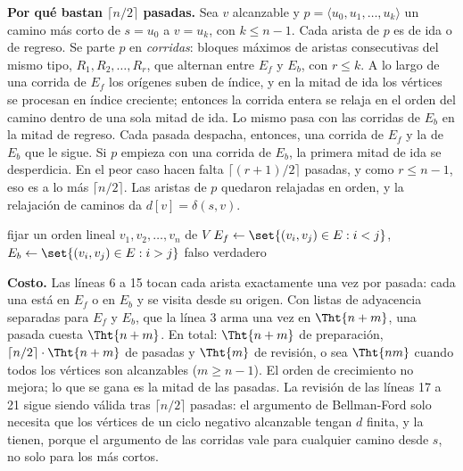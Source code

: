 \documentclass[11pt,letterpaper]{article}
\begin{document}
\textbf{Por qué bastan $\lceil n/2 \rceil$ pasadas.} Sea $v$
alcanzable y $p = \langle u_0, u_1, \dots, u_k \rangle$ un camino más
corto de $s = u_0$ a $v = u_k$, con $k \le n - 1$. Cada arista de $p$
es de ida o de regreso. Se parte $p$ en \emph{corridas}: bloques
máximos de aristas consecutivas del mismo tipo,
$R_1, R_2, \dots, R_r$, que alternan entre $E_f$ y $E_b$, con
$r \le k$. A lo largo de una corrida de $E_f$ los orígenes suben de
índice, y en la mitad de ida los vértices se procesan en índice
creciente; entonces la corrida entera se relaja en el orden del camino
dentro de una sola mitad de ida. Lo mismo pasa con las corridas de
$E_b$ en la mitad de regreso. Cada pasada despacha, entonces, una
corrida de $E_f$ y la de $E_b$ que le sigue. Si $p$ empieza con una
corrida de $E_b$, la primera mitad de ida se desperdicia. En el peor
caso hacen falta $\lceil (r + 1)/2 \rceil$ pasadas, y como
$r \le n - 1$, eso es a lo más $\lceil n/2 \rceil$. Las aristas de
$p$ quedaron relajadas en orden, y la relajación de caminos da
$d[v] = \delta(s, v)$.

\begin{algorithm}[H]
\caption{\textsc{Bellman-Ford-Yen}$(G, w, s)$}
\label{alg:caminos-yen}
\begin{algorithmic}[1]
  \State fijar un orden lineal $v_1, v_2, \dots, v_n$ de $V$
  \State $E_f \gets \set{(v_i, v_j) \in E : i < j}$, \quad
         $E_b \gets \set{(v_i, v_j) \in E : i > j}$
  \State {}
     
        \State {}
      \EndFor
    \EndFor
     
        \State {}
      \EndFor
    \EndFor
  \EndFor
      \State \Return falso 
    \EndIf
  \EndFor
  \State \Return verdadero
\EndProcedure
\end{algorithmic}
\end{algorithm}

\textbf{Costo.} Las líneas 6 a 15 tocan cada arista exactamente una
vez por pasada: cada una está en $E_f$ o en $E_b$ y se visita desde su
origen. Con listas de adyacencia separadas para $E_f$ y $E_b$, que la
línea 3 arma una vez en $\Tht{n + m}$, una pasada cuesta
$\Tht{n + m}$. En total: $\Tht{n + m}$ de preparación,
$\lceil n/2 \rceil \cdot \Tht{n + m}$ de pasadas y $\Tht{m}$ de
revisión, o sea $\Tht{nm}$ cuando todos los vértices son alcanzables
($m \ge n - 1$). El orden de crecimiento no mejora; lo que se gana es
la mitad de las pasadas. La revisión de las líneas 17 a 21 sigue
siendo válida tras $\lceil n/2 \rceil$ pasadas: el argumento de
Bellman-Ford solo necesita que los vértices de un ciclo negativo
alcanzable tengan $d$ finita, y la tienen, porque el argumento de las
corridas vale para cualquier camino desde $s$, no solo para los más
cortos.
\end{document}
